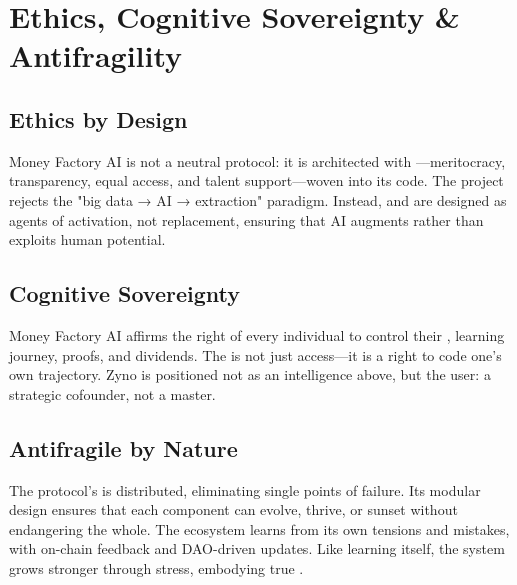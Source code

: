 
\section{Ethics, Cognitive Sovereignty \& Antifragility}

\subsection{Ethics by Design}
Money Factory AI is not a neutral protocol: it is architected with —meritocracy, transparency, equal access, and talent support—woven into its code. The project rejects the "big data → AI → extraction" paradigm. Instead,  and  are designed as agents of activation, not replacement, ensuring that AI augments rather than exploits human potential.

\subsection{Cognitive Sovereignty}
Money Factory AI affirms the right of every individual to control their , learning journey, proofs, and dividends. The  is not just access—it is a right to code one’s own trajectory. Zyno is positioned not as an intelligence above, but  the user: a strategic cofounder, not a master.

\subsection{Antifragile by Nature}
The protocol’s  is distributed, eliminating single points of failure. Its modular design ensures that each component can evolve, thrive, or sunset without endangering the whole. The ecosystem learns from its own tensions and mistakes, with on-chain feedback and DAO-driven updates. Like learning itself, the system grows stronger through stress, embodying true .

